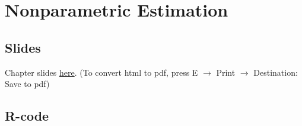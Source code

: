 \documentclass[
  letterpaper,
  DIV=11,
  numbers=noendperiod]{scrreprt}
\begin{document}

\hypertarget{nonparametric-estimation}{%
\chapter{Nonparametric Estimation}\label{nonparametric-estimation}}

\hypertarget{slides-2}{%
\section*{Slides}\label{slides-2}}


Chapter slides \href{chap3.html}{here}. (To convert html to pdf, press E
\(\to\) Print \(\to\) Destination: Save to pdf)

\hypertarget{r-code-2}{%
\section*{R-code}\label{r-code-2}}

\end{document}

